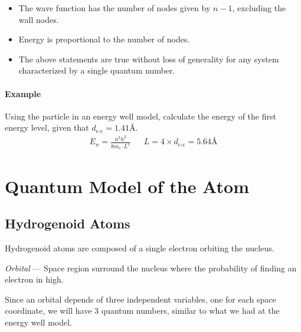 \documentclass{article}[10pt]
\begin{document}
\begin{itemize}
	\item The wave function has the number of nodes given by $n-1$, excluding the wall nodes.
	\item Energy is proportional to the number of nodes.
	\item The above statements are true without loss of generality for any system characterized by a single quantum number.
\end{itemize}
\paragraph{Example}

Using the particle in an energy well model, calculate the energy of the first energy
level, given that $d_{\text{c-c}}=1.41\si{\angstrom}$.
\begin{align*}
	E_n = \frac{n^2h^2}{8m_{e^{-}}L^2} &   & L=4\times d_{\text{c-c}}=5.64\si{\angstrom}
\end{align*}
\section{Quantum Model of the Atom}
\subsection{Hydrogenoid Atoms}
Hydrogenoid atoms are composed of a single electron orbiting the nucleus.

\emph{Orbital} --- Space region surround the nucleus where the probability of
finding an electron in high.

Since an orbital depends of three independent variables, one for each space
coordinate, we will have 3 quantum numbers, similar to what we had at the energy
well model.
\end{document}
